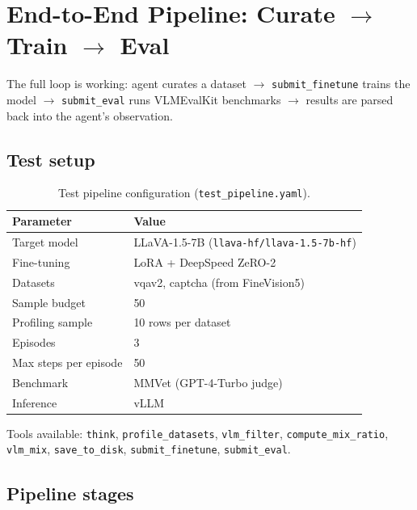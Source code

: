 
\newpage
\section{End-to-End Pipeline: Curate $\to$ Train $\to$ Eval}

The full loop is working: agent curates a dataset $\to$ \texttt{submit\_finetune} trains the model $\to$ \texttt{submit\_eval} runs VLMEvalKit benchmarks $\to$ results are parsed back into the agent's observation.

\subsection{Test setup}

\begin{table}[H]
\centering
\small
\caption{Test pipeline configuration (\texttt{test\_pipeline.yaml}).}
\begin{tabular}{ll}
\toprule
\textbf{Parameter} & \textbf{Value} \\
\midrule
Target model & LLaVA-1.5-7B (\texttt{llava-hf/llava-1.5-7b-hf}) \\
Fine-tuning & LoRA + DeepSpeed ZeRO-2 \\
Datasets & vqav2, captcha (from FineVision5) \\
Sample budget & 50 \\
Profiling sample & 10 rows per dataset \\
Episodes & 3 \\
Max steps per episode & 50 \\
Benchmark & MMVet (GPT-4-Turbo judge) \\
Inference & vLLM \\
\bottomrule
\end{tabular}
\end{table}

\noindent Tools available: \texttt{think}, \texttt{profile\_datasets}, \texttt{vlm\_filter}, \texttt{compute\_mix\_ratio}, \texttt{vlm\_mix}, \texttt{save\_to\_disk}, \texttt{submit\_finetune}, \texttt{submit\_eval}.

\subsection{Pipeline stages}

